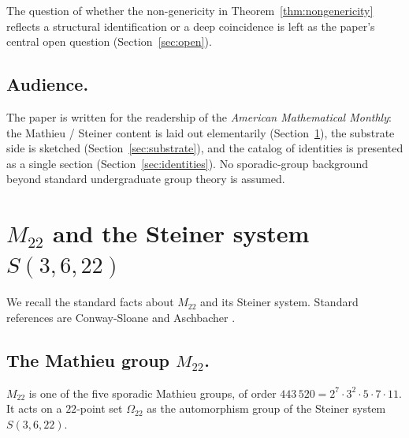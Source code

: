 \documentclass[11pt,reqno]{amsart}
\theoremstyle{plain}
\theoremstyle{definition}
\theoremstyle{remark}
\newcommand{\Mtwentytwo}{M_{22}}
\begin{document}
The question of whether the non-genericity in
Theorem~\ref{thm:nongenericity} reflects a structural identification
or a deep coincidence is left as the paper's central open question
(Section~\ref{sec:open}).

\subsection{Audience.}
The paper is written for the readership of the \emph{American
Mathematical Monthly}: the Mathieu / Steiner content is laid out
elementarily (Section~\ref{sec:m22-steiner}), the substrate side is
sketched (Section~\ref{sec:substrate}), and the catalog of identities
is presented as a single section (Section~\ref{sec:identities}). No
sporadic-group background beyond standard undergraduate group theory
is assumed.

\section{$\Mtwentytwo$ and the Steiner system $S(3, 6, 22)$}
\label{sec:m22-steiner}

We recall the standard facts about $\Mtwentytwo$ and its Steiner
system. Standard references are Conway-Sloane
\cite{ConwaySloane1999} and Aschbacher \cite{Aschbacher1994}.

\subsection{The Mathieu group $\Mtwentytwo$.}
$\Mtwentytwo$ is one of the five sporadic Mathieu groups, of order
$443\,520 = 2^{7} \cdot 3^{2} \cdot 5 \cdot 7 \cdot 11$. It acts on a
$22$-point set $\Omega_{22}$ as the automorphism group of the Steiner
system $S(3, 6, 22)$.
\end{document}
